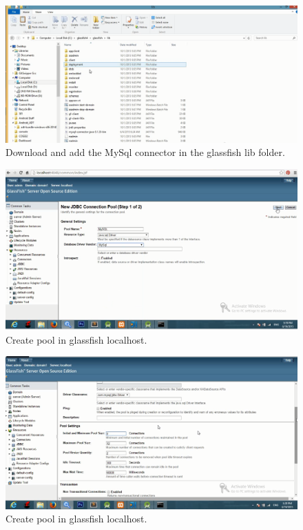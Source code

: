 \documentclass[hidelinks, 12pt, oneside]{article}
\begin{document}
\begin{figure}[!htb]
\begin{center}
\caption{Download and add the MySql connector in the glassfish lib folder.}
\includegraphics[width=150mm,scale=0.8]{img/mysql.png}
\end{center}
\label{Img:MySqlConnector}
\end{figure}

\begin{figure}[!htb]
\begin{center}
\caption{Create pool in glassfish localhost.}
\includegraphics[width=150mm,scale=0.6]{img/creatingPool1.png}
\end{center}
\label{Img:CreatingPool}
\end{figure}

\begin{figure}[!htb]
\begin{center}
\caption{Create pool in glassfish localhost.}
\includegraphics[width=150mm,scale=0.6]{img/creatingPool3.png}
\end{center}
\label{Img:CreatingPool}
\end{figure}
\end{document}
